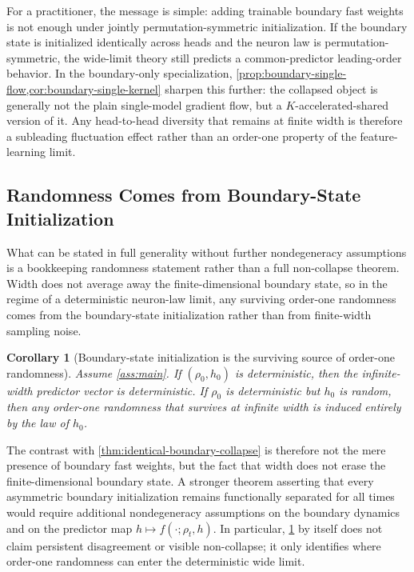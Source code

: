 \documentclass[11pt]{article}
\newtheorem{corollary}[theorem]{Corollary}
\theoremstyle{definition}
\begin{document}
For a practitioner, the message is simple: adding trainable boundary fast
weights is not enough under jointly permutation-symmetric initialization. If
the boundary state is initialized identically across heads and the neuron law is
permutation-symmetric, the wide-limit theory still predicts a
common-predictor leading-order behavior. In the boundary-only specialization,
\cref{prop:boundary-single-flow,cor:boundary-single-kernel} sharpen this
further: the collapsed object is generally not the plain single-model gradient
flow, but a $K$-accelerated-shared version of it. Any head-to-head diversity that
remains at finite width is therefore a subleading fluctuation effect rather than
an order-one property of the feature-learning limit.

\subsection{Randomness Comes from Boundary-State Initialization}
\label{sec:regime-b}

What can be stated in full generality without further nondegeneracy assumptions
is a bookkeeping randomness statement rather than a full non-collapse theorem. Width does
not average away the finite-dimensional boundary state, so in the regime of a
deterministic neuron-law limit, any surviving order-one randomness comes from
the boundary-state initialization rather than from finite-width sampling noise.

\begin{corollary}[Boundary-state initialization is the surviving source of order-one randomness]
\label{cor:boundary-init}
Assume \cref{ass:main}. If $(\rho_0,h_0)$ is deterministic, then the
infinite-width predictor vector is deterministic. If $\rho_0$ is deterministic
but $h_0$ is random, then any order-one randomness that survives at infinite
width is induced entirely by the law of $h_0$.
\end{corollary}

The contrast with \cref{thm:identical-boundary-collapse} is therefore not the
mere presence of boundary fast weights, but the fact that width does not erase
the finite-dimensional boundary state. A stronger theorem asserting that every
asymmetric boundary initialization remains functionally separated for all times
would require additional nondegeneracy assumptions on the boundary dynamics and
on the predictor map $h\mapsto f(\cdot;\rho_t,h)$. In particular,
\cref{cor:boundary-init} by itself does not claim persistent disagreement or
visible non-collapse; it only identifies where order-one randomness can enter
the deterministic wide limit.
\end{document}
